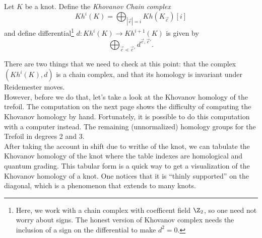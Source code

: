 \begin{tuftepage}
\begin{definition}
Let $K$ be a knot. Define the \emph{Khovanov Chain complex}
\[Kh^i(K)=\bigoplus_{|\vec c|=i} Kh(K_{\vec c})[i]\]
and define differential\footnote{Here, we work with a chain complex with coefficent field $\Z_2$, so one need not worry about signs. The honest version of Khovanov complex needs the inclusion of a sign on the differential to make $d^2=0$. } $d: Kh^i(K)\to Kh^{i+1}(K)$ is given by 
\[\bigoplus_{\vec c\lessdot \vec c'} d^{\vec c, \vec c'}.\]
\end{definition}
There are two things that we need to check at this point: that the complex $(Kh^i(K), d)$ is a chain complex, and that its homology is invariant under Reidemester moves. \\
However, before we do that, let's take a look at the Khovanov homology of the trefoil. 
The computation on the next page shows the difficulty of computing the Khovanov homology by hand. Fortunately, it is possible to do this computation with a computer instead. The remaining (unnormalized) homology groups for the Trefoil in degrees 2 and 3.  \\
 After taking the account in shift due to writhe of the knot, we can tabulate the Khovanov homology of the knot where the table indexes are homological and quantum grading.  This tabular form is a quick way to get a visualization of the Khovanov homology of a knot. One notices that it is ``thinly supported'' on the diagonal, which is a phenomenon that extends to many knots. \\
\end{tuftepage}
